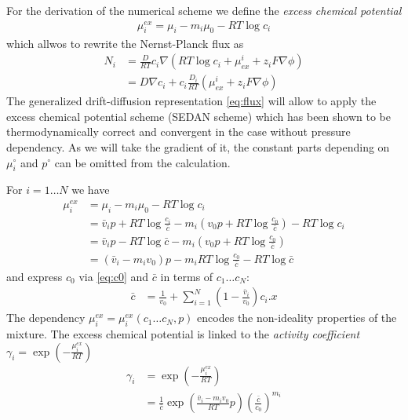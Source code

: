 \documentclass[12pt,oneside,reqno]{amsart}
\numberwithin{equation}{section}
\begin{document}
For the derivation of the numerical scheme we define the \textit{excess chemical potential}
\begin{align}\label{eq:muexdef}
  \mu^{ex}_i = \mu_i - m_i\mu_0 -  RT \log c_i
\end{align}
 which allwos to rewrite the Nernst-Planck flux as 
\begin{align}
  N_i &= \frac{D}{RT} c_i \nabla\left( RT \log c_i  +  \mu^i_{ex} +z_iF\nabla\phi\right) \nonumber\\
      &= D\nabla c_i  +  c_i\frac{D_i}{RT}(\mu^i_{ex} +z_iF\nabla\phi) \label{eq:flux}
\end{align}
The generalized drift-diffusion representation \eqref{eq:flux} will allow to apply the excess chemical potential
scheme (SEDAN scheme) \cite{GaudeulFuhrmann, EisenbergLiu} which has been shown to be thermodynamically correct and convergent in the case without pressure
dependency. As we will take the gradient of it, the constant parts depending on $\mu_i^\circ$ and $p^\circ$ can be
omitted from the calculation.

For $i=1\dots N$ we have
\begin{align}
  \mu_i^{ex} &= \mu_i -m_i \mu_0  - RT \log c_i\nonumber\\
             &= \bar v_ip +  RT \log \frac{c_i}{\bar c}  -m_i\left(  v_0p + RT \log \frac{c_0}{\bar c}\right)  - RT \log c_i  \nonumber\\
            &= \bar v_ip - RT\log \bar c -m_i\left(v_0p + RT \log \frac{c_0}{\bar c}\right)\nonumber\\
            &= \left(\bar v_i-m_iv_0\right)p -m_iRT\log \frac{c_0}{\bar c} - RT\log \bar c \label{eq:muex}
\end{align}
and express $c_0$ via \eqref{eq:c0} and $\bar c$ in terms of $c_1\dots c_N$:
\begin{align*}
  \bar c &%
          = \frac{1}{v_0} + \sum_{i=1}^N \left(1- \frac{\bar v_i}{v_0}\right) c_i .x
\end{align*}
The dependency $\mu_i^{ex}=\mu_i^{ex}(c_1\dots c_N, p)$  encodes the non-ideality properties of the mixture.
The excess chemical potential is linked to the \textit{activity coefficient} $\gamma_i=\exp(-\frac{\mu_i^{ex}}{RT})$
\cite{IUPAC,Fuhrmann2015}
\begin{align*}
  \gamma_i&=\exp(-\frac{\mu_i^{ex}}{RT})\\
         &= \frac{1}{\bar c}\exp\left(\frac{\bar v_i-m_iv_0}{RT}p\right)\left(\frac{\bar c}{c_0}\right)^{m_i}
\end{align*}
\end{document}
